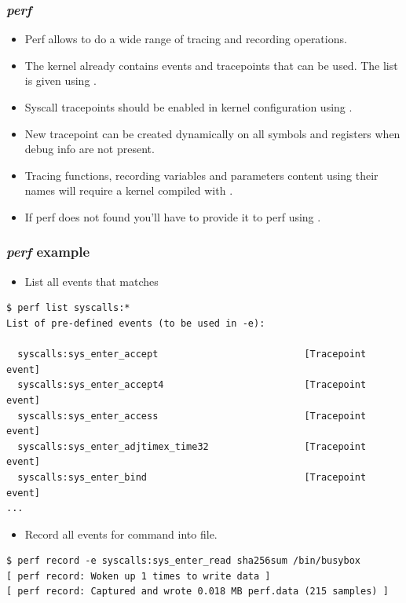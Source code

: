 \begin{frame}
  \frametitle{{\em perf}}
  \begin{itemize}
    \item Perf allows to do a wide range of tracing and recording operations.
    \item The kernel already contains events and tracepoints that can be used.
          The list is given using .
    \item Syscall tracepoints should be enabled in kernel configuration using
          .
    \item New tracepoint can be created dynamically on all symbols and registers
          when debug info are not present.
    \item Tracing functions, recording variables and parameters content using
          their names will require a kernel compiled with
          .
    \item If perf does not found  you'll have to provide it to
          perf using .
  \end{itemize}
\end{frame}

\begin{frame}[fragile]
  \frametitle{{\em perf} example}
  \begin{itemize}
    \item List all events that matches 
  \end{itemize}
  \begin{block}{}
    \begin{verbatim}
$ perf list syscalls:*
List of pre-defined events (to be used in -e):

  syscalls:sys_enter_accept                          [Tracepoint event]
  syscalls:sys_enter_accept4                         [Tracepoint event]
  syscalls:sys_enter_access                          [Tracepoint event]
  syscalls:sys_enter_adjtimex_time32                 [Tracepoint event]
  syscalls:sys_enter_bind                            [Tracepoint event]
...
    \end{verbatim}
  \end{block}
  \begin{itemize}
    \item Record all  events for 
          command into  file.
  \end{itemize}
  \begin{block}{}
    \begin{verbatim}
$ perf record -e syscalls:sys_enter_read sha256sum /bin/busybox
[ perf record: Woken up 1 times to write data ]
[ perf record: Captured and wrote 0.018 MB perf.data (215 samples) ]
    \end{verbatim}
  \end{block}
\end{frame}

